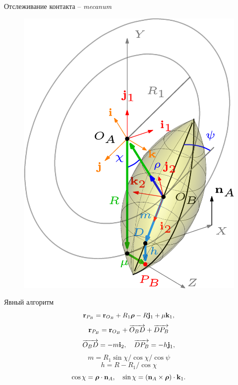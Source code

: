 \documentclass{beamer}
\begin{document}
\begin{frame}{Отслеживание контакта -- \textit{mecanum}}
        \begin{figure}[htb]
            \centering\includegraphics[width=\textwidth]{content/pic/asy/pic_mecanum.png}
            \label{ContactScheme}
        \end{figure}
    \endminipage
    \quad
        Явный алгоритм
        $$
        {\bf r}_{P_B}={\bf r}_{O_B}+R_1\boldsymbol{\mathbf{\rho}} -R{\bf j}_1+\mu {\bf k}_1,
        $$
        $$
        {\bf r}_{P_B}={\bf r}_{O_B}+\overrightarrow{O_BD}+\overrightarrow{DP_B}
        $$
        $$
        \overrightarrow{O_BD}=-m{\bf i}_2,\quad\overrightarrow{DP_B}=-h{\bf j}_1,
        $$
        $$m=R_1\sin\chi / \cos\chi/\cos\psi $$
        $$h=R-R_1/\cos\chi$$
        $$
        \cos\chi=\boldsymbol{\mathbf{\rho}}\cdot{\bf n}_A, \quad \sin\chi=
        \left({\bf n}_A\times\boldsymbol{\mathbf{\rho}}\right)\cdot {\bf k}_1.
        $$
    \endminipage
\end{frame}
\end{document}
